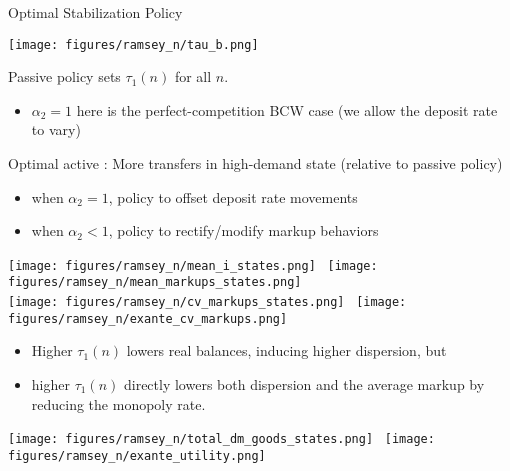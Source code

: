 \documentclass[10pt,english,slidetop,compress,
              blue,mathserif,color=option]{beamer}
\theoremstyle{plain}
\theoremstyle{definition}
\begin{document}
\begin{frame}[allowframebreaks]{Optimal Stabilization Policy}
  \break

  \begin{center}
    \texttt{[image: figures/ramsey\_n/tau\_b.png]}
  \end{center}

      Passive policy sets $\tau_{1}(n)$ for all $n$.
      \begin{itemize} 
        \item $\alpha_{2}=1$ here is the perfect-competition BCW case (we allow the deposit rate to vary)
      \end{itemize}
      \alert{Optimal active }: More transfers in high-demand state (relative to passive policy)
      \begin{itemize}
        \item when $\alpha_{2} =1$, policy to offset deposit rate movements
        \item when $\alpha_{2} <1$, policy to rectify/modify markup behaviors
      \end{itemize}


    \break
    \begin{center}
      \texttt{[image: figures/ramsey\_n/mean\_i\_states.png]}
      \
      \texttt{[image: figures/ramsey\_n/mean\_markups\_states.png]}
      \\
      \texttt{[image: figures/ramsey\_n/cv\_markups\_states.png]}
      \
      \texttt{[image: figures/ramsey\_n/exante\_cv\_markups.png]}
    \end{center}
    \begin{itemize}
      \item Higher $\tau_{1}(n)$ lowers real balances, inducing higher dispersion, but
      \item higher $\tau_{1}(n)$ directly lowers both dispersion and the average markup by reducing the monopoly rate.
    \end{itemize}

    \break

    \begin{center}
      \texttt{[image: figures/ramsey\_n/total\_dm\_goods\_states.png]}
      \ 
      \texttt{[image: figures/ramsey\_n/exante\_utility.png]}
    \end{center}


\end{frame}
\end{document}

